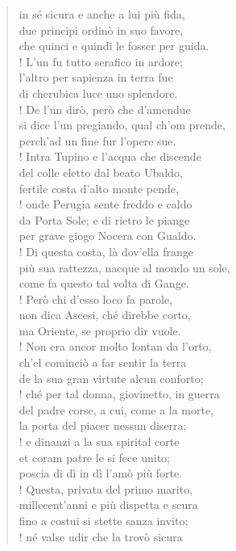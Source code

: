 \documentclass[a4paper, twoside, titlepage]{book}
\newcounter{mar}
\begin{document}
\begin{verse}
in sé sicura e anche a lui più fida,\\
due principi ordinò in suo favore,\\
che quinci e quindi le fosser per guida.\\!
L’un fu tutto serafico in ardore;\\
l’altro per sapienza in terra fue\\
di cherubica luce uno splendore.\\!
De l’un dirò, però che d’amendue\\
si dice l’un pregiando, qual ch’om prende,\\
perch’ad un fine fur l’opere sue.\\!
Intra Tupino e l’acqua che discende\\
del colle eletto dal beato Ubaldo,\\
fertile costa d’alto monte pende,\\!
onde Perugia sente freddo e caldo\\
da Porta Sole; e di rietro le piange\\
per grave giogo Nocera con Gualdo.\\!
Di questa costa, là dov’ella frange\\
più sua rattezza, nacque al mondo un sole,\\
come fa questo tal volta di Gange.\\!
Però chi d’esso loco fa parole,\\
non dica Ascesi, ché direbbe corto,\\
ma Oriente, se proprio dir vuole.\\!
Non era ancor molto lontan da l’orto,\\
ch’el cominciò a far sentir la terra\\
de la sua gran virtute alcun conforto;\\!
ché per tal donna, giovinetto, in guerra\\
del padre corse, a cui, come a la morte,\\
la porta del piacer nessun diserra;\\!
e dinanzi a la sua spirital corte\\
et coram patre le si fece unito;\\
poscia di dì in dì l’amò più forte.\\!
Questa, privata del primo marito,\\
millecent’anni e più dispetta e scura\\
fino a costui si stette sanza invito;\\!
né valse udir che la trovò sicura\\

\end{verse}
\end{document}
